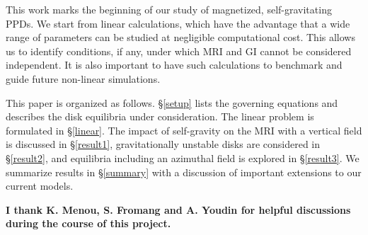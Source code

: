 \documentclass[iop]{emulateapj}
\begin{document}
This work marks the beginning of our study of magnetized,
self-gravitating PPDs. We start from linear calculations, which  
have the advantage that a wide range of parameters can be studied at
negligible computational cost. This  allows us to identify
conditions, if any, under which MRI and GI 
cannot be considered independent. It is also important to have such 
calculations to benchmark and guide future non-linear
simulations.   


This paper is organized as follows. \S\ref{setup} lists the governing
equations and describes the disk equilibria under consideration. 
The linear problem is formulated in \S\ref{linear}. The impact
of self-gravity on the MRI with a vertical field is discussed in
\S\ref{result1}, gravitationally unstable disks are considered in
\S\ref{result2}, and equilibria including an azimuthal field is explored in
\S\ref{result3}. We summarize results in \S\ref{summary} with a 
discussion of important extensions to our current models.





 


\acknowledgements
{\bf I thank K. Menou, S. Fromang and A. Youdin for helpful discussions
during the course of this project. 
}
\appendix




\end{document}
